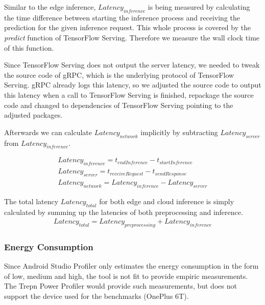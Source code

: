 Similar to the edge inference, $Latency_{inference}$ is being measured by calculating the time difference between starting the inference process and receiving the prediction for the given inference request. This whole process is covered by the \emph{predict} function of TensorFlow Serving. Therefore we measure the wall clock time of this function.

Since TensorFlow Serving does not output the server latency, we needed to tweak the source code of gRPC, which is the underlying protocol of TensorFlow Serving. gRPC already logs this latency, so we adjusted the source code to output this latency when a call to TensorFlow Serving is finished, repackage the source code and changed to dependencies of TensorFlow Serving pointing to the adjusted packages.

Afterwards we can calculate $Latency_{network}$ implicitly by subtracting $Latency_{server}$ from $Latency_{inference}$.

\begin{equation*}
\begin{gathered}
Latency_{inference} = t_{endInference} - t_{startInference}\\
Latency_{server}= t_{receive Request} - t_{send Response}\\
Latency_{network} = Latency_{inference} - Latency_{server}
\end{gathered}
\end{equation*}


The total latency $Latency_{total}$ for both edge and cloud inference is simply calculated by summing up the latencies of both preprocessing and inference.
\begin{equation*}
\begin{gathered}
Latency_{total} = Latency_{preprocessing} + Latency_{inference}
\end{gathered}
\end{equation*}
\subsubsection{Energy Consumption}
Since Android Studio Profiler only estimates the energy consumption in the form of low, medium and high, the tool is not fit to provide empiric measurements. The Trepn Power Profiler would provide such measurements, but does not support the device used for the benchmarks (OnePlus 6T).
